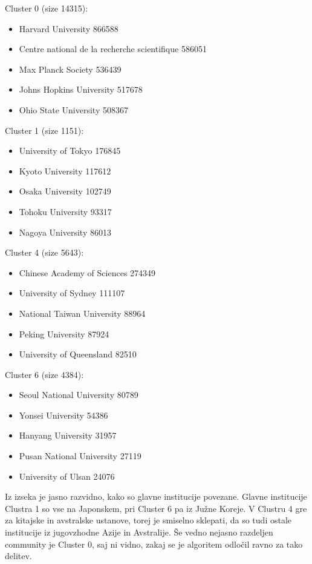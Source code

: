 \documentclass[a4paper,12pt]{article}
\begin{document}
	Cluster 0 (size 14315):
	\begin{itemize}
		\item Harvard University 866588
		\item Centre national de la recherche scientifique 586051
		\item Max Planck Society 536439
		\item Johns Hopkins University 517678
		\item Ohio State University 508367
	\end{itemize}

	\hspace{1cm}	
	
	Cluster 1 (size 1151):
	\begin{itemize}
		\item University of Tokyo 176845
		\item Kyoto University 117612
		\item Osaka University 102749
		\item Tohoku University 93317
		\item Nagoya University 86013
	\end{itemize} 
	
	\hspace{1cm}
	
	Cluster 4 (size 5643):
	\begin{itemize}
		\item Chinese Academy of Sciences 274349
		\item University of Sydney 111107
		\item National Taiwan University 88964
		\item Peking University 87924
		\item University of Queensland 82510
	\end{itemize}

	\hspace{1cm}
	
	Cluster 6 (size 4384):
	\begin{itemize}
		\item Seoul National University 80789
		\item Yonsei University 54386
		\item Hanyang University 31957
		\item Pusan National University 27119
		\item University of Ulsan 24076
	\end{itemize}

	
	Iz izseka je jasno razvidno, kako so glavne institucije povezane. Glavne institucije Clustra 1 so vse na Japonskem, pri Cluster 6 pa iz Južne Koreje. V Clustru 4 gre za kitajske in avstralske ustanove, torej je smiselno sklepati, da so tudi ostale institucije iz jugovzhodne Azije in Avstralije. Še vedno nejasno razdeljen community je Cluster 0, saj ni vidno, zakaj se je algoritem odločil ravno za tako delitev.
	
\end{document}
